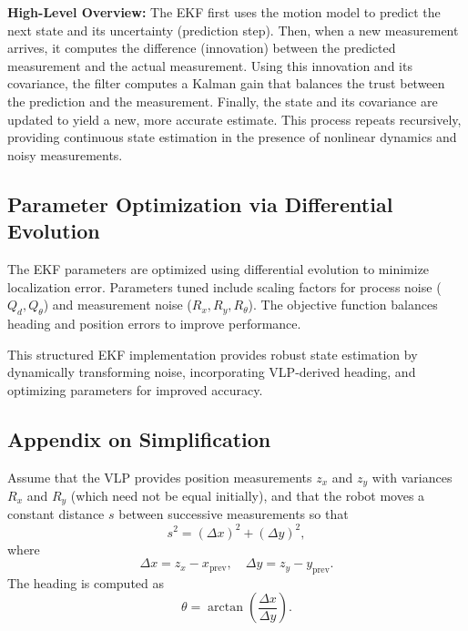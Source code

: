 \bigskip

\textbf{High-Level Overview:}  
The EKF first uses the motion model to predict the next state and its uncertainty (prediction step). Then, when a new measurement arrives, it computes the difference (innovation) between the predicted measurement and the actual measurement. Using this innovation and its covariance, the filter computes a Kalman gain that balances the trust between the prediction and the measurement. Finally, the state and its covariance are updated to yield a new, more accurate estimate. This process repeats recursively, providing continuous state estimation in the presence of nonlinear dynamics and noisy measurements.



\subsection*{Parameter Optimization via Differential Evolution}

The EKF parameters are optimized using differential evolution to minimize localization error. Parameters tuned include scaling factors for process noise (\(Q_d, Q_\theta\)) and measurement noise (\(R_x, R_y, R_\theta\)). The objective function balances heading and position errors to improve performance.

This structured EKF implementation provides robust state estimation by dynamically transforming noise, incorporating VLP-derived heading, and optimizing parameters for improved accuracy.

\subsection*{Appendix on Simplification}

Assume that the VLP provides position measurements \( z_x \) and \( z_y \) with variances \( R_x \) and \( R_y \) (which need not be equal initially), and that the robot moves a constant distance \( s \) between successive measurements so that
\[
s^2 = (\Delta x)^2 + (\Delta y)^2,
\]
where
\[
\Delta x = z_x - x_{\text{prev}}, \quad \Delta y = z_y - y_{\text{prev}}.
\]
The heading is computed as
\[
\theta = \arctan\left(\frac{\Delta x}{\Delta y}\right).
\]

